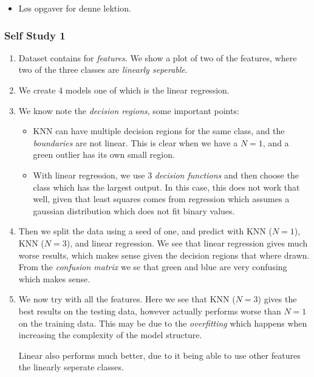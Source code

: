 \begin{mdframed}[frametitle={Questions that Need Answering}]
    \begin{itemize}
        \item Løs opgaver for denne lektion.
    \end{itemize}
\end{mdframed}

\subsubsection{Self Study 1}

\begin{enumerate}
    \item Dataset contains for \emph{features}. We show a plot of two of the features, where two of the three classes are \emph{linearly seperable}.
    \item We create 4 models one of which is the linear regression.
    \item We know note the \emph{decision regions}, some important points:
        \begin{itemize}
            \item KNN can have multiple decision regions for the same class, and the \emph{boundaries} are not linear.
                This is clear when we have a $N=1$, and a green outlier has its own small region.
            \item With linear regression, we use 3 \emph{decision functions} and then choose the class which has the largest output.
                In this case, this does not work that well, given that least squares comes from regression which assumes a gaussian distribution which does not fit binary values.
        \end{itemize}
    \item Then we split the data using a seed of one, and predict with KNN ($N=1$), KNN ($N=3$), and linear regression.
        We see that linear regression gives much worse results, which makes sense given the decision regions that where drawn.
        From the \emph{confusion matrix} we se that green and blue are very confusing which makes sense.
    \item We now try with all the features.
        Here we see that KNN ($N=3$) gives the best results on the testing data, however actually performs worse than $N=1$ on the training data.
        This may be due to the \emph{overfitting} which happens when increasing the complexity of the model structure.

        Linear also performs much better, due to it being able to use other features the linearly seperate classes.
\end{enumerate}

